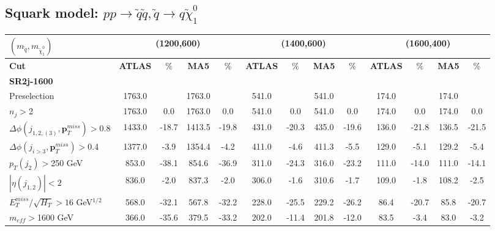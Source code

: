 \documentclass[a4paper,11pt]{article}
\begin{document}
	\clearpage
			\begin{landscape}
	\subsection{Squark model: $p p \rightarrow \tilde q \tilde q , \tilde q \rightarrow q \tilde \chi _1 ^0$}


	\begin{table}[h]
		\centering
		\renewcommand\arraystretch{1.2} 
		\scriptsize
		\begin{tabular}{ | l | c c c c  || c c c c || c c c c | } \toprule
 $(m_{\tilde q},m_{\tilde \chi _1 ^0})$ &	\multicolumn{4}{c}{\textbf{(1200,600)}} & \multicolumn{4}{c}{\textbf{(1400,600)}} &
 \multicolumn{4}{c|}{\textbf{(1600,400)}} \\ \hline 
 		
			\textbf{Cut} & \textbf{ATLAS} & $\%$ & \textbf{MA5} & $\%$ & \textbf{ATLAS} & $\%$ & \textbf{MA5} & $\%$ & \textbf{ATLAS} & $\%$ & \textbf{MA5} & $\%$ \\ \hline \hline


\multicolumn{13}{|l|}{\textbf{SR2j-1600}} \\ \hline
Preselection&1763.0&&1763.0&&541.0&&541.0&&174.0&&174.0&
\\
$n_j>$2&1763.0&0.0&1763.0&0.0&541.0&0.0&541.0&0.0&174.0&0.0&174.0&0.0
\\
$\Delta \phi(j_{1,2,(3)},\mathbf{p}_T^{miss})>$0.8&1433.0&-18.7&1413.5&-19.8&431.0&-20.3&435.0&-19.6&136.0&-21.8&136.5&-21.5
\\
$\Delta \phi(j_{i>3},\mathbf{p}_T^{miss})>$0.4&1377.0&-3.9&1354.4&-4.2&411.0&-4.6&411.3&-5.5&129.0&-5.1&129.2&-5.4
\\
$p_T(j_2)>$250 GeV &853.0&-38.1&854.6&-36.9&311.0&-24.3&316.0&-23.2&111.0&-14.0&111.0&-14.1
\\
$|\eta(j_{1,2})|<2$&836.0&-2.0&837.3&-2.0&306.0&-1.6&310.6&-1.7&109.0&-1.8&108.2&-2.5
\\
$E_T^{miss}/\sqrt{H_T}>16 $ GeV$^{1/2}$&568.0&-32.1&567.8&-32.2&228.0&-25.5&229.2&-26.2&86.4&-20.7&85.8&-20.7
\\
$m_{eff}>$1600 GeV&366.0&-35.6&379.5&-33.2&202.0&-11.4&201.8&-12.0&83.5&-3.4&83.0&-3.2
\\ \hline


\end{tabular}
\end{table}
\end{landscape}
\end{document}

